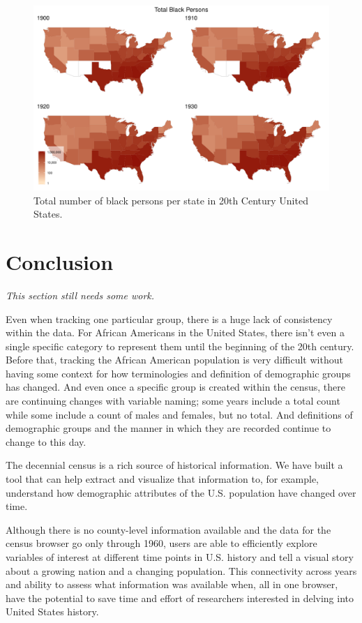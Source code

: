 \documentclass[DIV=calc, paper=a4, fontsize=10pt, twocolumn]{scrartcl}\usepackage[]{graphicx}\usepackage[]{color}
\newenvironment{knitrout}{}{} %
\begin{document}
\begin{knitrout}
\color{fgcolor}\begin{figure}[h]
\includegraphics[width=.5\textwidth]{figure/map_1900s-1} \caption[Total number of black persons per state in 20th Century United States]{Total number of black persons per state in 20th Century United States.}\label{fig:map_1900s}
\end{figure}


\end{knitrout}




\section*{Conclusion}

\par \textit{This section still needs some work.}

\par Even when tracking one particular group, there is a huge lack of consistency within the data. For African Americans in the United States, there isn't even a single specific category to represent them until the beginning of the 20th century. Before that, tracking the African American population is very difficult without having some context for how terminologies and definition of demographic groups has changed. And even once a specific group is created within the census, there are continuing changes with variable naming; some years include a total count while some include a count of males and females, but no total. And definitions of demographic groups and the manner in which they are recorded continue to change to this day. 

\par The decennial census is a rich source of historical information. We have built a tool that can help extract and visualize that information to, for example, understand how demographic attributes of the U.S. population have changed over time.

\par Although there is no county-level information available and the data for the census browser go only through 1960, users are able to efficiently explore variables of interest at different time points in U.S. history and tell a visual story about a growing nation and a changing population. This connectivity across years and ability to assess what information was available when, all in one browser, have the potential to save time and effort of researchers interested in delving into United States history.
\end{document}
